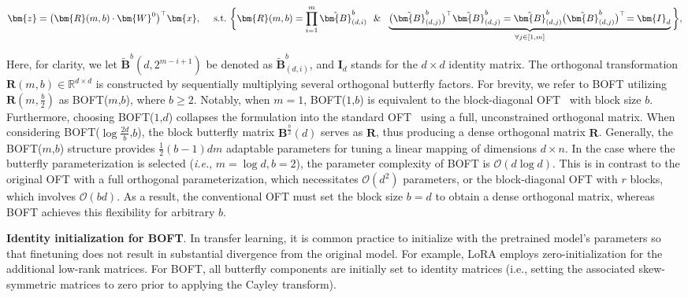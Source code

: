 \begin{equation}
    \begin{aligned}\nonumber
    \bm{z}=\big(\bm{R}(m,b)\cdot\bm{W}^0\big)^\top\bm{x},~~~~\text{s.t.}~\bigg{\{}\bm{R}(m,b)=\prod_{i=1}^m \tilde{\bm{B}}^b_{(d,i)}~~\&~~\underbrace{\big(\tilde{\bm{B}}^b_{(d,j)}\big)^\top\tilde{\bm{B}}^b_{(d,j)}=\tilde{\bm{B}}^b_{(d,j)}\big(\tilde{\bm{B}}^b_{(d,j)}\big)^\top\!=\bm{I}_d}_{\forall j\in [1, m]}\bigg{\}},
    \end{aligned}
\end{equation}

Here, for clarity, we let $\tilde{\bm{B}}^b(d,2^{m - i+1})$ be denoted as $\tilde{\bm{B}}^b_{(d,i)}$, and $\bm{I}_d$ stands for the $d \times d$ identity matrix. The orthogonal transformation $\bm{R}(m,b)\in\mathbb{R}^{d\times d}$ is constructed by sequentially multiplying several orthogonal butterfly factors. For brevity, we refer to BOFT utilizing $\bm{R}(m, \frac{b}{2})$ as BOFT($m$,$b$), where $b \geq 2$. Notably, when $m=1$, BOFT($1$,$b$) is equivalent to the block-diagonal OFT~\cite{qiu2023controlling} with block size $b$. Furthermore, choosing BOFT($1$,$d$) collapses the formulation into the standard OFT~\cite{qiu2023controlling} using a full, unconstrained orthogonal matrix. When considering BOFT($\log \frac{2d}{b}$,$b$), the block butterfly matrix $\bm{B}^{\frac{b}{2}}(d)$ serves as $\bm{R}$, thus producing a dense orthogonal matrix $\bm{R}$. Generally, the BOFT($m$,$b$) structure provides $\frac{1}{2}(b-1)dm$ adaptable parameters for tuning a linear mapping of dimensions $d \times n$. In the case where the butterfly parameterization is selected (\emph{i.e.}, $m=\log d, b=2$), the parameter complexity of BOFT is $\mathcal{O}(d\log d)$. This is in contrast to the original OFT with a full orthogonal parameterization, which necessitates $\mathcal{O}(d^2)$ parameters, or the block-diagonal OFT with $r$ blocks, which involves $\mathcal{O}(bd)$. As a result, the conventional OFT must set the block size $b=d$ to obtain a dense orthogonal matrix, whereas BOFT achieves this flexibility for arbitrary $b$.

\textbf{Identity initialization for BOFT}. In transfer learning, it is common practice to initialize with the pretrained model’s parameters so that finetuning does not result in substantial divergence from the original model. For example, LoRA employs zero-initialization for the additional low-rank matrices. For BOFT, all butterfly components are initially set to identity matrices (i.e., setting the associated skew-symmetric matrices to zero prior to applying the Cayley transform).

